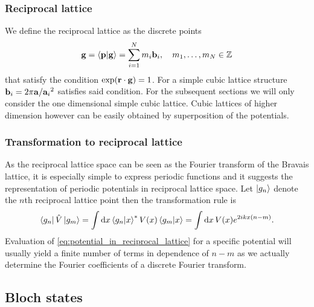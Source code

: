 \subsubsection{Reciprocal lattice}

We define the reciprocal lattice as the discrete points
\begin{equation}
  \vb{g}
  =\bra{\vb{p}}\ket{\vb{g}}
  =\sum_{i=1}^Nm_i\vb{b}_i
  \qc m_1,\dots,m_N\in\mathbb{Z}
\end{equation}
that satisfy the condition $\exp(\vb{r}\cdot\vb{g})=1$. For a simple cubic
lattice structure $\vb{b}_i=2\pi\vb{a}/{{\vb{a}_i}^2}$ satisfies said
condition. For the subsequent sections we will only consider the one
dimensional simple cubic lattice. Cubic lattices of higher dimension however
can be easily obtained by superposition of the potentials.

\subsubsection{Transformation to reciprocal lattice}

As the reciprocal lattice space can be seen as the Fourier transform of the
Bravais lattice, it is especially simple to express periodic functions and it
suggests the representation of periodic potentials in reciprocal lattice
space. Let $\ket{g_n}$ denote the $n$th reciprocal lattice point then the
transformation rule is
\begin{equation}
  \bra{g_n}\hat{V}\ket{g_m}
  =\int\dd{x}\bra{g_n}\ket{x}^*V(x)\bra{g_m}\ket{x}
  =\int\dd{x}V(x)e^{2ikx(n-m)}
  \label{eq:potential_in_reciprocal_lattice}.
\end{equation}
Evaluation of \cref{eq:potential_in_reciprocal_lattice} for a specific
potential will usually yield a finite number of terms in dependence of
$n-m$ as we actually determine the Fourier coefficients of a discrete Fourier
transform.

\subsection{Bloch states}


